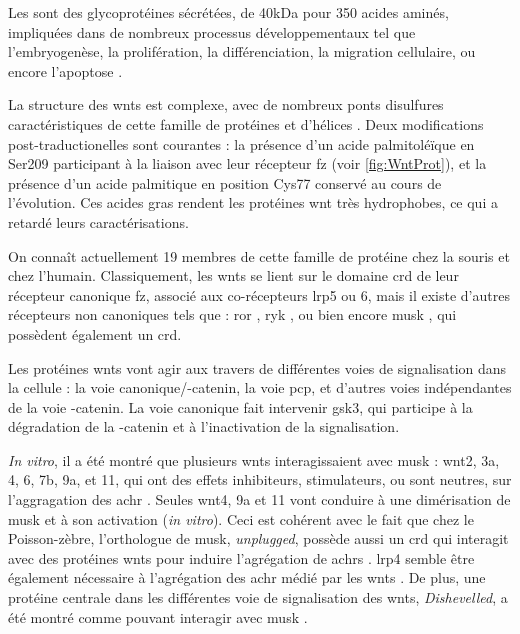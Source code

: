 	Les  sont des glycoprotéines sécrétées, de 40kDa pour 350 acides aminés, impliquées dans de nombreux processus développementaux tel que l'embryogenèse, la prolifération, la différenciation, la migration cellulaire, ou encore l'apoptose \cite{Miller2002, Willert2012}. 
	
	La structure des \Glspl{wnt} est complexe, avec  de nombreux ponts disulfures caractéristiques de cette famille de protéines et d'hélices \textalpha{}. Deux modifications post-traductionelles sont courantes : la présence d'un acide palmitoléïque en Ser209 participant à la liaison avec leur récepteur \gls{fz} (voir \cref{fig:WntProt}), et la présence d'un acide palmitique en position Cys77 conservé au cours de l'évolution\cite{Takada2006}. Ces acides gras rendent les protéines \Gls{wnt} très hydrophobes, ce qui a retardé leurs caractérisations.
	
	On connaît actuellement 19 membres de cette famille de protéine chez la souris et chez l'humain. Classiquement, les \Glspl{wnt} se lient sur le domaine \gls{crd} de leur récepteur canonique \gls{fz}, associé aux co-récepteurs \gls{lrp}5 ou 6, mais il existe d'autres récepteurs non canoniques tels que : \gls{ror} \cite{Cadigan2006, Gordon2006, Green2008}, \gls{ryk} \cite{Bovolenta2006, Fradkin2010}, ou bien encore \gls{musk} \cite{Jing2009}, qui possèdent également un \gls{crd}.
	
	Les protéines \glspl{wnt} vont agir aux travers de différentes voies de signalisation dans la cellule : la voie canonique/\textbeta{}-catenin, la voie \gls{pcp}, et d'autres voies indépendantes de la voie \textbeta{}-catenin. La voie canonique fait intervenir \gls{gsk3}, qui participe à la dégradation de la \textBeta{}-catenin et à l'inactivation de la signalisation. 
	
	\emph{In vitro}, il a été montré que plusieurs \Glspl{wnt} interagissaient avec \gls{musk} : \Gls{wnt}2, 3a, 4, 6, 7b, 9a, et 11, qui ont des effets inhibiteurs, stimulateurs, ou sont neutres, sur l'aggragation des \gls{achr} \cite{Strochlic2012, Zhang2012, Barik2014}. Seules \gls{wnt}4, 9a et 11 vont conduire à une dimérisation de \gls{musk} et à son activation (\emph{in vitro}). Ceci est cohérent avec le fait que chez le Poisson-zèbre, l'orthologue de \gls{musk}, \emph{unplugged}, possède aussi un \gls{crd} qui interagit avec des protéines \Glspl{wnt} pour induire l'agrégation de \glspl{achr} \cite{Jing2009, Gordon2012}. \Gls{lrp}4 semble être également nécessaire à l'agrégation des \gls{achr} médié par les \gls{wnt}s \cite{Zhang2012}. De plus, une protéine centrale dans les différentes voie de signalisation des \Glspl{wnt}, \emph{Dishevelled}, a été montré comme pouvant interagir avec \gls{musk} \cite{Luo2002a}.

